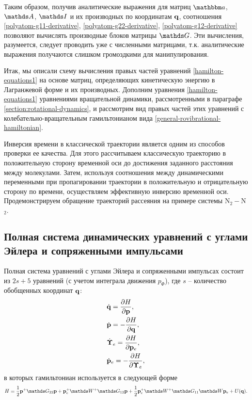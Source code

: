 Таким образом, получив аналитические выражения для матриц $\bba$, $\bbA$, $\bbI$ и их производных по координатам $\mathbf{q}$, соотношения \eqref{polyatom-g11-derivative}, \eqref{polyatom-g22-derivative}, \eqref{polyatom-g12-derivative} позволяют вычислять производные блоков матрицы $\bbG$. Эти вычисления, разумеется, следует проводить уже с численными матрицами, т.к. аналитические выражения получаются слишком громоздкими для манипулирования. \par
Итак, мы описали схему вычисления правых частей уравнений \eqref{hamilton-equations1} на основе матриц, определяющих кинетическую энергию в Лагранжевой форме и их производных. Дополним уравнения \eqref{hamilton-equations1} уравнениями вращательной динамики, рассмотренными в параграфе \ref{section:rotational-dynamics}, и рассмотрим вид правых частей этих уравнений с колебательно-вращательным гамильтонианом вида \eqref{general-rovibrational-hamiltonian}. \par
Инверсия времени в классической траектории является одним из способов проверки ее качества. Для этого рассчитываем классическую траекторию в положительную сторону временной оси до достижения заданного расстояния между молекулами. Затем, используя соотношения между динамическими переменными при пропагировании траектории в положительную и отрицательную сторону по времени, осуществляем эффективную инверсию временной оси. Продемонстрируем обращение траекторий рассеяния на примере системы N$_2-$N$_2$. 

\subsection{Полная система динамических уравнений с углами Эйлера и сопряженными импульсами}
    Полная система уравнений с углами Эйлера и сопряженными импульсах состоит из $2s + 5$ уравнений (с учетом интеграла движения $p_\Phi$), где $s$ -- количество обобщенных координат $\mathbf{q}$:
\begin{gather}
    \begin{aligned}
        &\dot{\mathbf{q}} = \frac{\partial H}{\partial \mathbf{p}}, \\
        &\dot{\mathbf{p}} = -\frac{\partial H}{\partial \mathbf{q}}, \\
        &\dot{\boldsymbol{\Upsilon}}_e = \frac{\partial H}{\partial \mathbf{p}_e}, \\
        &\dot{\mathbf{p}}_e = - \frac{\partial H}{\partial \boldsymbol{\Upsilon}_e},
    \end{aligned} \label{full-system-euler}
\end{gather}
%
в которых гамильтониан используется в следующей форме
\begin{gather}
    H = \frac{1}{2} \mf{p}^+ \bbG_{22} \mf{p} + \mf{p}^+_e \bbW^+ \bbG_{12} \mf{p} + \frac{1}{2} \mf{p}^+_e \bbW^+ \bbG_{11} \bbW \pe + U(\mf{q}). \label{general-rovibrational-hamiltonian-euler}
\end{gather}

